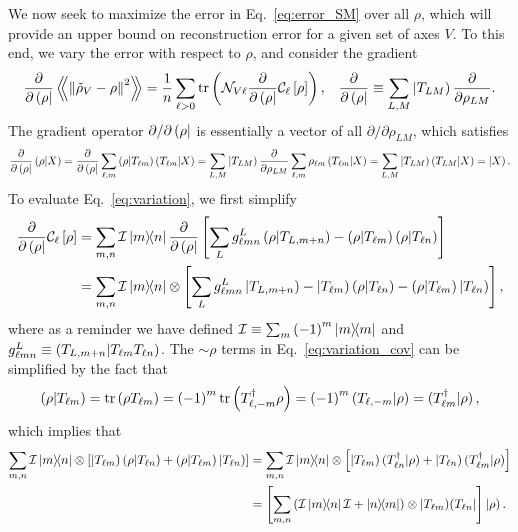 \documentclass[notitlepage,twocolumn]{revtex4-2}
\newcommand{\f}[2]{\dfrac{#1}{#2}} %
\newcommand{\p}[1]{\left(#1\right)} %
\renewcommand{\sp}[1]{\left[#1\right]} %
\newcommand{\Bbk}[1]
{\left\langle\!\!\left\langle #1 \right\rangle\!\!\right\rangle}
\newcommand{\C}{\mathcal{C}}
\newcommand{\I}{\mathcal{I}}
\newcommand{\N}{\mathcal{N}}
\def\obra#1{\mathinner{({#1}|}}
\def\oket#1{\mathinner{|{#1})}}
\def\obk#1{\mathinner{({#1})}}
\def\oop#1#2{\oket{#1}\!\obra{#2}}
\begin{document}
We now seek to maximize the error in Eq.~\eqref{eq:error_SM} over all $\rho$, which will provide an upper bound on reconstruction error for a given set of axes $V$.
To this end, we vary the error with respect to $\rho$, and consider the gradient
\begin{align}
  \f{\partial}{\partial\obra\rho} \Bbk{\norm{\tilde\rho_V-\rho}^2}
  = \f1n \sum_{\ell>0} \tr\p{\N_{V\ell}
    \f{\partial}{\partial\obra\rho} \C_\ell\sp{\rho}},
  &&
  \f{\partial}{\partial\obra\rho}
  \equiv \sum_{L,M} \oket{T_{LM}} \f{\partial}{\partial\rho_{LM}}.
  \label{eq:variation}
\end{align}
The gradient operator $\partial/\partial\obra\rho$ is essentially a vector of all $\partial/\partial\rho_{LM}$, which satisfies
\begin{align}
  \f{\partial}{\partial\obra\rho} \obk{\rho|X}
  = \f{\partial}{\partial\obra\rho}
  \sum_{\ell,m} \obk{\rho|T_{\ell m}} \obk{T_{\ell m}|X}
  = \sum_{L,M} \oket{T_{LM}} \f{\partial}{\partial\rho_{LM}}
  \sum_{\ell,m} \rho_{\ell m} \obk{T_{\ell m}|X}
  = \sum_{L,M} \oket{T_{LM}} \obk{T_{LM}|X}
  = \oket{X}.
\end{align}
To evaluate Eq.~\eqref{eq:variation}, we first simplify
\begin{align}
  \f{\partial}{\partial\obra\rho} \C_\ell\sp{\rho}
  &= \sum_{m,n} \I \op{m}{n}
  \f{\partial}{\partial\obra\rho}
  \sp{\sum_L g_{\ell mn}^L \obk{\rho|T_{L,m+n}}
    - \obk{\rho|T_{\ell m}} \obk{\rho|T_{\ell n}}} \\
  &= \sum_{m,n} \I\op{m}{n} \otimes
  \sp{\sum_L g_{\ell mn}^L \oket{T_{L,m+n}}
    - \oket{T_{\ell m}} \obk{\rho|T_{\ell n}}
    - \obk{\rho|T_{\ell m}} \oket{T_{\ell n}}},
  \label{eq:variation_cov}
\end{align}
where as a reminder we have defined $\I\equiv\sum_m\p{-1}^m\op{m}$ and $g_{\ell mn}^L\equiv\obk{T_{L,m+n}|T_{\ell m}T_{\ell n}}$.
The $\sim\rho$ terms in Eq.~\eqref{eq:variation_cov} can be simplified by the fact that
\begin{align}
  \obk{\rho|T_{\ell m}}
  = \tr\p{\rho T_{\ell m}}
  = \p{-1}^m \tr\p{T_{\ell,-m}^\dag \rho}
  = \p{-1}^m \obk{T_{\ell,-m}|\rho}
  = \obk{T_{\ell m}^\dag|\rho},
\end{align}
which implies that
\begin{align}
  \sum_{m,n} \I \op{m}{n} \otimes
  \sp{\oket{T_{\ell m}} \obk{\rho|T_{\ell n}}
    + \obk{\rho|T_{\ell m}} \oket{T_{\ell n}}}
  &= \sum_{m,n} \I \op{m}{n} \otimes
  \sp{\oket{T_{\ell m}} \obk{T_{\ell n}^\dag|\rho}
    + \oket{T_{\ell n}} \obk{T_{\ell m}^\dag|\rho}} \\
  &= \sp{\sum_{m,n} \p{\I\op{m}{n}\I + \op{n}{m}}
    \otimes \oop{T_{\ell m}}{T_{\ell n}}} \oket{\rho}.
\end{align}
\end{document}
